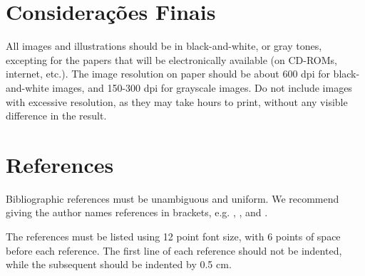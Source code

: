 \documentclass[12pt]{article}
\begin{document}
\section{Considerações Finais}

All images and illustrations should be in black-and-white, or gray tones,
	excepting for the papers that will be electronically available (on CD-ROMs,
	internet, etc.). The image resolution on paper should be about 600 dpi for
	black-and-white images, and 150-300 dpi for grayscale images.  Do not include
	images with excessive resolution, as they may take hours to print, without any
	visible difference in the result. 
	
	\section{References}
	
	Bibliographic references must be unambiguous and uniform.  We recommend giving
	the author names references in brackets, e.g. \cite{knuth:84},
	\cite{boulic:91}, and \cite{smith:99}.
	
	The references must be listed using 12 point font size, with 6 points of space
	before each reference. The first line of each reference should not be
	indented, while the subsequent should be indented by 0.5 cm.
	



\end{document}
